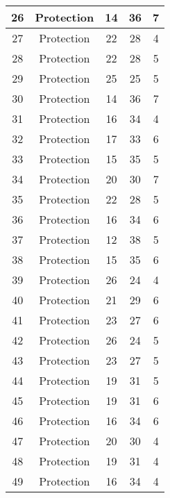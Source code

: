 \documentclass[results.tex]{subfiles}
\begin{document}
\begin{center}
\begin{tabular}{| c || c | c | c | c |}
    \hline
    26 & Protection & 14 & 36 & 7 \\ 
    \hline
    27 & Protection & 22 & 28 & 4 \\ 
    \hline
    28 & Protection & 22 & 28 & 5 \\ 
    \hline
    29 & Protection & 25 & 25 & 5 \\ 
    \hline
    30 & Protection & 14 & 36 & 7 \\ 
    \hline
    31 & Protection & 16 & 34 & 4 \\ 
    \hline
    32 & Protection & 17 & 33 & 6 \\ 
    \hline
    33 & Protection & 15 & 35 & 5 \\ 
    \hline
    34 & Protection & 20 & 30 & 7 \\ 
    \hline
    35 & Protection & 22 & 28 & 5 \\ 
    \hline
    36 & Protection & 16 & 34 & 6 \\ 
    \hline
    37 & Protection & 12 & 38 & 5 \\ 
    \hline
    38 & Protection & 15 & 35 & 6 \\ 
    \hline
    39 & Protection & 26 & 24 & 4 \\ 
    \hline
    40 & Protection & 21 & 29 & 6 \\ 
    \hline
    41 & Protection & 23 & 27 & 6 \\ 
    \hline
    42 & Protection & 26 & 24 & 5 \\ 
    \hline
    43 & Protection & 23 & 27 & 5 \\ 
    \hline
    44 & Protection & 19 & 31 & 5 \\ 
    \hline
    45 & Protection & 19 & 31 & 6 \\ 
    \hline
    46 & Protection & 16 & 34 & 6 \\ 
    \hline
    47 & Protection & 20 & 30 & 4 \\ 
    \hline
    48 & Protection & 19 & 31 & 4 \\ 
    \hline
    49 & Protection & 16 & 34 & 4 \\ 
    \hline   \end{tabular}
\end{center}
\end{document}

